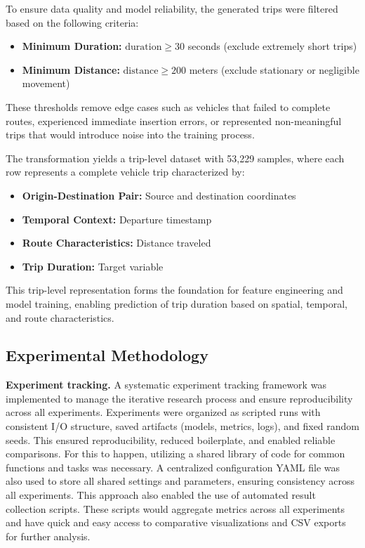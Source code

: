 To ensure data quality and model reliability, the generated trips were filtered based on the following criteria:

\begin{itemize}
    \item \textbf{Minimum Duration:} $\text{duration} \geq 30$ seconds (exclude extremely short trips)
    \item \textbf{Minimum Distance:} $\text{distance} \geq 200$ meters (exclude stationary or negligible movement)
\end{itemize}

These thresholds remove edge cases such as vehicles that failed to complete routes, experienced immediate insertion errors, or represented non-meaningful trips that would introduce noise into the training process.

The transformation yields a trip-level dataset with 53,229 samples, where each row represents a complete vehicle trip characterized by:
\begin{itemize}
    \item \textbf{Origin-Destination Pair:} Source and destination coordinates
    \item \textbf{Temporal Context:} Departure timestamp
    \item \textbf{Route Characteristics:} Distance traveled
    \item \textbf{Trip Duration:} Target variable
\end{itemize}

This trip-level representation forms the foundation for feature engineering and model training, enabling prediction of trip duration based on spatial, temporal, and route characteristics.

\subsection{Experimental Methodology}
\textbf{Experiment tracking.} A systematic experiment tracking framework was implemented to manage the iterative research process and ensure reproducibility across all experiments.
Experiments were organized as scripted runs with consistent I/O structure, saved artifacts (models, metrics, logs), and fixed random seeds.
This ensured reproducibility, reduced boilerplate, and enabled reliable comparisons.
For this to happen, utilizing a shared library of code for common functions and tasks was necessary.
A centralized configuration YAML file was also used to store all shared settings and parameters, ensuring consistency across all experiments.
This approach also enabled the use of automated result collection scripts.
These scripts would aggregate metrics across all experiments and have quick and easy access to comparative visualizations and CSV exports for further analysis.

